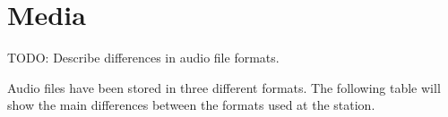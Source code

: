 \documentclass[../StudioOperationGuide.tex]{subfiles}
\begin{document}
\chapter{Media}
TODO: Describe differences in audio file formats.


Audio files have been stored in three different formats. The following
table will show the main differences between the formats used at the
station.

\end{document}
